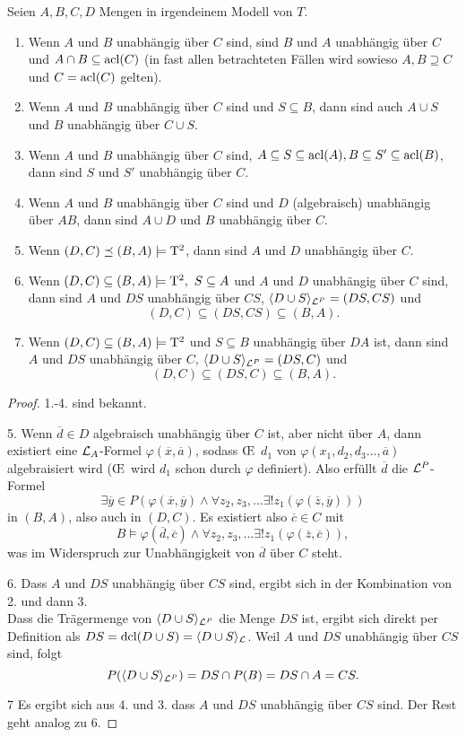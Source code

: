 \begin{lemma}\label{Unabhängigkeitsregeln}
	Seien $A,B,C,D$ Mengen in irgendeinem Modell von $T$.
	\begin{enumerate}
		\item Wenn $A$ und $B$ unabhängig über $C$ sind, sind $B$ und $A$ unabhängig über $C$ und $A\cap B\subseteq\operatorname{acl}(C)$ (in fast allen betrachteten Fällen wird sowieso $A,B\supseteq C$ und $C=\operatorname{acl}(C)$ gelten).
		\item Wenn $A$ und $B$ unabhängig über $C$ sind und $S\subseteq B$, dann sind auch $A\cup S$ und $B$ unabhängig über $C\cup S$.
		\item Wenn $A$ und $B$ unabhängig über $C$ sind, $A\subseteq S\subseteq\operatorname{acl}(A),B\subseteq S'\subseteq\operatorname{acl}(B)$, dann sind $S$ und $S'$ unabhängig über $C$.
		\item Wenn $A$ und $B$ unabhängig über $C$ sind und $D$ (algebraisch) unabhängig über $AB$, dann sind $A\cup D$ und $B$ unabhängig über $C$.
		\item Wenn $(D,C)\preceq(B,A)\models\operatorname{T^2}$, dann sind $A$ und $D$ unabhängig über $C$.
		\item Wenn $(D,C)\subseteq(B,A)\models\tq,\ S\subseteq A$ und $A$ und $D$ unabhängig über $C$ sind, dann sind $A$ und $DS$ unabhängig über $CS$, $\langle D\cup S\rangle_{\mathcal{L}^P}=(DS,CS)$ und $$(D,C)\subseteq(DS,CS)\subseteq(B,A).$$
		\item Wenn $(D,C)\subseteq(B,A)\models\operatorname{T^2}$ und $S\subseteq B$ unabhängig über $DA$ ist, dann sind $A$ und $DS$ unabhängig über $C$, $\langle D\cup S\rangle_{\mathcal{L}^P}=(DS,C)$ und $$(D,C)\subseteq(DS,C)\subseteq(B,A).$$
	\end{enumerate}
\end{lemma}
\newpage
\begin{proof}
	1.-4. sind bekannt.
	\item[5.] Wenn $\overline{d}\in D$ algebraisch unabhängig über $C$ ist, aber nicht über $A$, dann existiert eine $\mathcal{L}_A$-Formel $\varphi(\overline{x},\overline{a})$, sodass \OE\ $d_1$ von $\varphi(x_1,d_2,d_3\dots,\overline{a})$ algebraisiert wird (\OE\ wird $d_1$ schon durch $\varphi$ definiert). Also erfüllt $\overline{d}$ die $\mathcal{L}^P$-Formel $$\exists \overline{y}\in P(\varphi(\overline{x},\overline{y})\land\forall z_2,z_3,\dots\exists! z_1(\varphi(\overline{z},\overline{y})))$$ in $(B,A)$, also auch in $(D,C)$. Es existiert also $\overline{c}\in C$ mit $$B\models\varphi(\overline{d},\overline{c})\land\forall z_2,z_3,\dots\exists! z_1(\varphi(\overline{z},\overline{c})),$$ was im Widerspruch zur Unabhängigkeit von $\overline{d}$ über $C$ steht.
	\item[6.] Dass $A$ und $DS$ unabhängig über $CS$ sind, ergibt sich in der Kombination von 2. und dann 3.\\
	Dass die Trägermenge von $\langle D\cup S\rangle_{\mathcal{L}^P}$ die Menge $DS$ ist, ergibt sich direkt per Definition als $DS=\operatorname{dcl}(D\cup S)=\langle D\cup S\rangle_{\mathcal{L}}$. Weil $A$ und $DS$ unabhängig über $CS$ sind, folgt $$P(\langle D\cup S\rangle_{\mathcal{L}^P})=DS\cap P(B)=DS\cap A=CS.$$
	\item[7] Es ergibt sich aus 4. und 3. dass $A$ und $DS$ unabhängig über $CS$ sind. Der Rest geht analog zu 6.
\end{proof}

